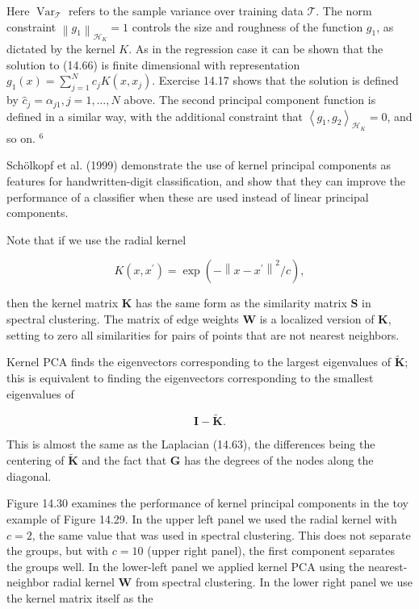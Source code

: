 \documentclass[10pt]{article}
\begin{document}
Here $\operatorname{Var}_{\mathcal{T}}$ refers to the sample variance over training data $\mathcal{T}$. The norm constraint $\left\|g_{1}\right\|_{\mathcal{H}_{K}}=1$ controls the size and roughness of the function $g_{1}$, as dictated by the kernel $K$. As in the regression case it can be shown that the solution to (14.66) is finite dimensional with representation $g_{1}(x)= \sum_{j=1}^{N} c_{j} K\left(x, x_{j}\right)$. Exercise 14.17 shows that the solution is defined by $\hat{c}_{j}= \alpha_{j 1}, j=1, \ldots, N$ above. The second principal component function is defined in a similar way, with the additional constraint that $\left\langle g_{1}, g_{2}\right\rangle_{\mathcal{H}_{K}}=0$, and so on. ${ }^{6}$

Schölkopf et al. (1999) demonstrate the use of kernel principal components as features for handwritten-digit classification, and show that they can improve the performance of a classifier when these are used instead of linear principal components.

Note that if we use the radial kernel


\begin{equation*}
K\left(x, x^{\prime}\right)=\exp \left(-\left\|x-x^{\prime}\right\|^{2} / c\right), \tag{14.67}
\end{equation*}


then the kernel matrix $\mathbf{K}$ has the same form as the similarity matrix $\mathbf{S}$ in spectral clustering. The matrix of edge weights $\mathbf{W}$ is a localized version of $\mathbf{K}$, setting to zero all similarities for pairs of points that are not nearest neighbors.

Kernel PCA finds the eigenvectors corresponding to the largest eigenvalues of $\widetilde{\mathbf{K}}$; this is equivalent to finding the eigenvectors corresponding to the smallest eigenvalues of


\begin{equation*}
\mathbf{I}-\widetilde{\mathbf{K}} . \tag{14.68}
\end{equation*}


This is almost the same as the Laplacian (14.63), the differences being the centering of $\widetilde{\mathbf{K}}$ and the fact that $\mathbf{G}$ has the degrees of the nodes along the diagonal.

Figure 14.30 examines the performance of kernel principal components in the toy example of Figure 14.29. In the upper left panel we used the radial kernel with $c=2$, the same value that was used in spectral clustering. This does not separate the groups, but with $c=10$ (upper right panel), the first component separates the groups well. In the lower-left panel we applied kernel PCA using the nearest-neighbor radial kernel $\mathbf{W}$ from spectral clustering. In the lower right panel we use the kernel matrix itself as the
\end{document}
